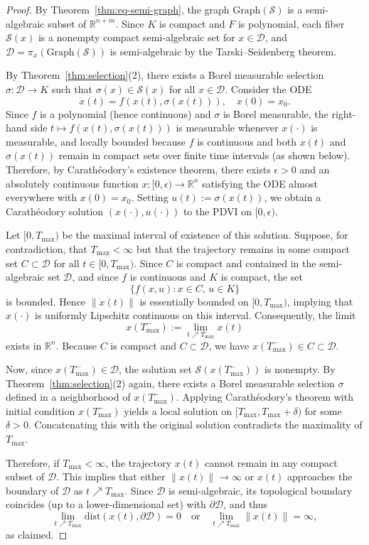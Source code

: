\documentclass[10pt,a4paper]{amsart}
\begin{document}
\begin{proof}
By Theorem~\ref{thm:eq-semi-graph}, the graph $\mathrm{Graph}(\mathcal{S})$ is a semi-algebraic subset of $\mathbb{R}^{n+m}$. Since $K$ is compact and $F$ is polynomial, each fiber $\mathcal{S}(x)$ is a nonempty compact semi-algebraic set for $x \in \mathcal{D}$, and $\mathcal{D} = \pi_x(\mathrm{Graph}(\mathcal{S}))$ is semi-algebraic by the Tarski--Seidenberg theorem.

By Theorem~\ref{thm:selection}(2), there exists a Borel measurable selection $\sigma : \mathcal{D} \to K$ such that $\sigma(x) \in \mathcal{S}(x)$ for all $x \in \mathcal{D}$. Consider the ODE
\[
\dot{x}(t) = f(x(t), \sigma(x(t))), \quad x(0) = x_0.
\]
Since $f$ is a polynomial (hence continuous) and $\sigma$ is Borel measurable, the right-hand side $t \mapsto f(x(t), \sigma(x(t)))$ is measurable whenever $x(\cdot)$ is measurable, and locally bounded because $f$ is continuous and both $x(t)$ and $\sigma(x(t))$ remain in compact sets over finite time intervals (as shown below). Therefore, by Carath\'{e}odory's existence theorem, there exists $\epsilon > 0$ and an absolutely continuous function $x : [0, \epsilon) \to \mathbb{R}^n$ satisfying the ODE almost everywhere with $x(0) = x_0$. Setting $u(t) := \sigma(x(t))$, we obtain a Carath\'{e}odory solution $(x(\cdot), u(\cdot))$ to the PDVI on $[0, \epsilon)$.

Let $[0, T_{\max})$ be the maximal interval of existence of this solution. Suppose, for contradiction, that $T_{\max} < \infty$ but that the trajectory remains in some compact set $C \subset \mathcal{D}$ for all $t \in [0, T_{\max})$. Since $C$ is compact and contained in the semi-algebraic set $\mathcal{D}$, and since $f$ is continuous and $K$ is compact, the set
\[
\{ f(x, u) : x \in C,\, u \in K \}
\]
is bounded. Hence $\|\dot{x}(t)\|$ is essentially bounded on $[0, T_{\max})$, implying that $x(\cdot)$ is uniformly Lipschitz continuous on this interval. Consequently, the limit
\[
x(T_{\max}^-) := \lim_{t \nearrow T_{\max}} x(t)
\]
exists in $\mathbb{R}^n$. Because $C$ is compact and $C \subset \mathcal{D}$, we have $x(T_{\max}^-) \in C \subset \mathcal{D}$.

Now, since $x(T_{\max}^-) \in \mathcal{D}$, the solution set $\mathcal{S}(x(T_{\max}^-))$ is nonempty. By Theorem~\ref{thm:selection}(2) again, there exists a Borel measurable selection $\sigma$ defined in a neighborhood of $x(T_{\max}^-)$. Applying Carath\'{e}odory's theorem with initial condition $x(T_{\max}^-)$ yields a local solution on $[T_{\max}, T_{\max} + \delta)$ for some $\delta > 0$. Concatenating this with the original solution contradicts the maximality of $T_{\max}$.

Therefore, if $T_{\max} < \infty$, the trajectory $x(t)$ cannot remain in any compact subset of $\mathcal{D}$. This implies that either $\|x(t)\| \to \infty$ or $x(t)$ approaches the boundary of $\mathcal{D}$ as $t \nearrow T_{\max}$. Since $\mathcal{D}$ is semi-algebraic, its topological boundary coincides (up to a lower-dimensional set) with $\partial \mathcal{D}$, and thus
\[
\lim_{t \nearrow T_{\max}} \mathrm{dist}(x(t), \partial \mathcal{D}) = 0
\quad \text{or} \quad
\lim_{t \nearrow T_{\max}} \|x(t)\| = \infty,
\]
as claimed.
\end{proof}
\end{document}
